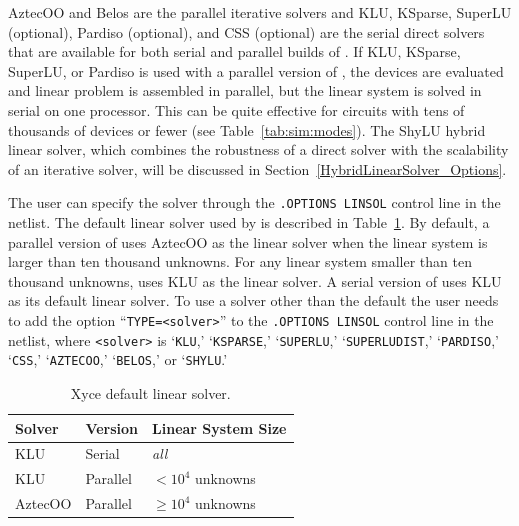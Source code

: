 AztecOO and Belos are the parallel iterative solvers and KLU, KSparse, SuperLU (optional), Pardiso (optional), and CSS (optional)
are the serial direct solvers that are available for both serial and parallel builds of \Xyce{}.  
If KLU, KSparse, SuperLU, or Pardiso is used with a parallel version of \Xyce{}, the devices are evaluated and
linear problem is assembled in parallel, but the linear system is solved in serial
on one processor.  This can be quite effective for circuits with tens of thousands of devices
or fewer (see Table~\ref{tab:sim:modes}). The ShyLU hybrid linear solver, which combines the robustness
of a direct solver with the scalability of an iterative solver, will be discussed in 
Section~\ref{HybridLinearSolver_Options}.  

The user can specify the solver through the \texttt{.OPTIONS LINSOL} control line 
in the netlist.  The default linear solver used by \Xyce{} is described in Table~\ref{tab:default:solver}.
By default, a parallel version of \Xyce{} uses AztecOO as the linear solver when the linear
system is larger than ten thousand unknowns.  For any linear system smaller than ten thousand unknowns,
\Xyce{} uses KLU as the linear solver.  A serial version of \Xyce{} uses KLU as its default linear 
solver.  To use a solver other than the default the user needs to add the option 
``\texttt{TYPE=<solver>}'' to the \texttt{.OPTIONS LINSOL}
control line in the netlist, where \texttt{<solver>}
is `\texttt{KLU},' `\texttt{KSPARSE},' `\texttt{SUPERLU},' `\texttt{SUPERLUDIST},' 
`\texttt{PARDISO},' `\texttt{CSS},' `\texttt{AZTECOO},' `\texttt{BELOS},' or `\texttt{SHYLU}.'

\begin{table}[htp]
\caption[\Xyce{} Default Linear Solver]{Xyce default linear solver.}
\label{tab:default:solver}
\begin{center}
\begin{tabular}{| p{3cm} | p{3cm} | p{4cm} |}
\hline
Solver & Version & Linear System Size\\
\hline
KLU & Serial & {\it all} \\
KLU & Parallel & $< 10^4$ unknowns \\
AztecOO & Parallel & $\geq 10^4$ unknowns \\
\hline
\end{tabular}
\end{center}
\end{table}

